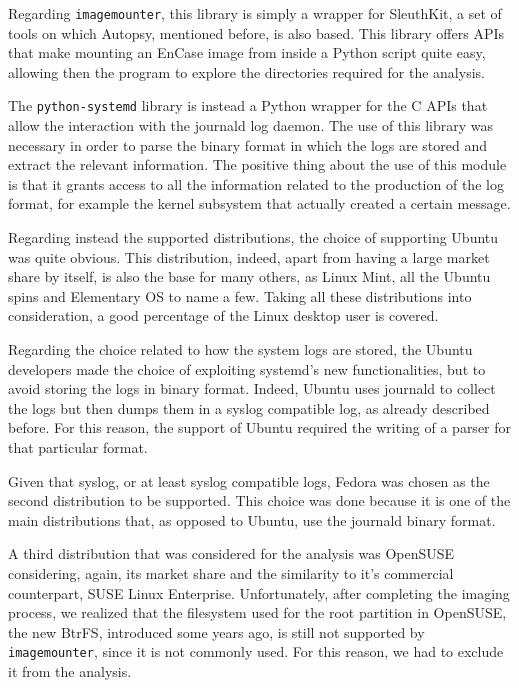 \documentclass[a4paper]{article}
\begin{document}
Regarding \texttt{imagemounter}, this library is simply a wrapper for
SleuthKit, a set of tools on which Autopsy, mentioned before, is also based.
This library offers APIs that make mounting an EnCase image from inside a Python
script quite easy, allowing then the program to explore the directories required
for the analysis.

The \texttt{python-systemd} library is instead a Python wrapper for the C APIs
that allow the interaction with the journald log daemon. The use of this library
was necessary in order to parse the binary format in which the logs are stored
and extract the relevant information. The positive thing about the use of this
module is that it grants access to all the information related to the production
of the log format, for example the kernel subsystem that actually created a
certain message.

Regarding instead the supported distributions, the choice of supporting Ubuntu
was quite obvious. This distribution, indeed, apart from having a large market
share by itself, is also the base for many others, as Linux Mint, all the Ubuntu
spins and Elementary OS to name a few. Taking all these distributions into
consideration, a good percentage of the Linux desktop user is covered.

Regarding the choice related to how the system logs are stored, the Ubuntu
developers made the choice of exploiting systemd's new functionalities, but to
avoid storing the logs in binary format. Indeed, Ubuntu uses journald to
collect the logs but then dumps them in a syslog compatible log, as already
described before. For this reason, the support of Ubuntu required the writing of
a parser for that particular format.

Given that syslog, or at least syslog compatible logs, Fedora was chosen as the
second distribution to be supported. This choice was done because it is one of
the main distributions that, as opposed to Ubuntu, use the journald binary
format.

A third distribution that was considered for the analysis was OpenSUSE
considering, again, its market share and the similarity to it's commercial
counterpart, SUSE Linux Enterprise. Unfortunately, after completing the imaging
process, we realized that the filesystem used for the root partition in
OpenSUSE, the new BtrFS, introduced some years ago, is still not supported by
\texttt{imagemounter}, since it is not commonly used. For this reason, we had to
exclude it from the analysis.
\end{document}

